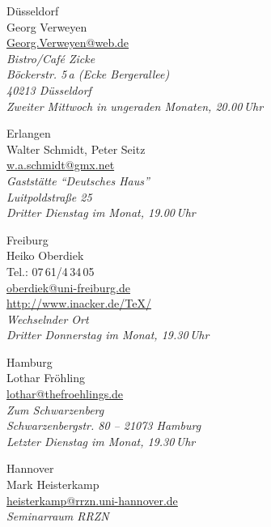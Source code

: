 \begin{multicols}{2}
\begin{roll}
 \item[Düsseldorf]  \ \\
   Georg Verweyen\\
   \url{Georg.Verweyen@web.de}\\
   \emph{Bistro/Café Zicke\\
     Böckerstr. 5\,a (Ecke Bergerallee)\\
     40213 Düsseldorf\\
     Zweiter Mittwoch in ungeraden Monaten, 20.00\,Uhr}
%
  \item[Erlangen] \ \\
    Walter Schmidt, Peter Seitz\\
    \url{w.a.schmidt@gmx.net}\\%
    \emph{Gaststätte "`Deutsches Haus"'\\
      Luitpoldstraße 25\\
      Dritter Dienstag im Monat, 19.00\,Uhr}%
%
  \item[Freiburg]  \ \\
    Heiko Oberdiek\\
    Tel.: 07\,61/4\,34\,05\\
    \url{oberdiek@uni-freiburg.de}\\
    \url{http://www.inacker.de/TeX/}\\
    \emph{Wechselnder Ort\\
      Dritter Donnerstag im Monat, 19.30\,Uhr}%
%
  \item[Hamburg]  \ \\%
    Lothar Fröhling\\
    \url{lothar@thefroehlings.de}\\
    \emph{Zum Schwarzenberg\\
	Schwarzenbergstr. 80 -- 21073  Hamburg\\
      Letzter Dienstag im Monat, 19.30\,Uhr}%
%
  \item[Hannover]  \ \\
    Mark Heisterkamp\\
    \url{heisterkamp@rrzn.uni-hannover.de}\\
    \emph{Seminarraum RRZN\\
}
\end{roll}
\end{multicols}
